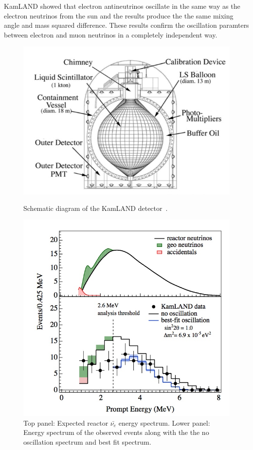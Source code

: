 KamLAND showed that electron antineutrinos oscillate in the same way as the electron neutrinos from the sun and the results produce the the same mixing angle and mass squared difference. These results confirm the oscillation paramters between electron and muon neutrinos in a completely independent way. 

\begin{figure}[h!]
  \centering
  \begin{minipage}[b]{0.49\textwidth}
    \includegraphics[width=\textwidth]{figures/KamLAND.jpeg}
    \vspace{2mm}
    \caption{Schematic diagram of the KamLAND detector~\cite{46KamLAND}.}
    \label{fig:KamLAND}
  \end{minipage}
  \hfill
  \begin{minipage}[b]{0.49\textwidth}
    \includegraphics[width=\textwidth]{figures/KamLAND2.jpeg}
       \vspace{2mm}
    \caption{Top panel: Expected reactor $\bar{\nu_e}$ energy spectrum. Lower panel: Energy spectrum of the observed events along with the the no oscillation spectrum and best fit spectrum. }
     \label{fig:KamLAND2}
  \end{minipage}
\end{figure}


